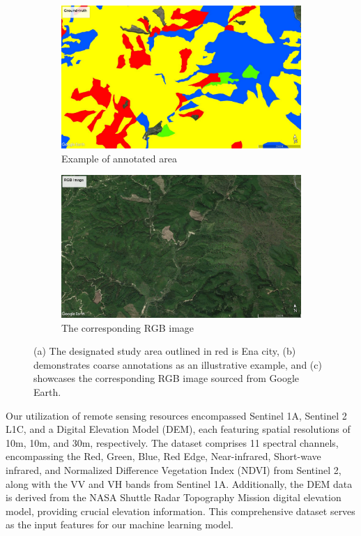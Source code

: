 \begin{figure}[p]
    \begin{subfigure}[c]{.5\textwidth}
      \centering
      \includegraphics[width=\textwidth]{figs/chap5/gt-ge.jpg}
      \caption{Example of annotated area}
      \label{fig:chap5_gtge}
    \end{subfigure}%
    \begin{subfigure}[c]{.5\textwidth}
      \centering
      \includegraphics[width=\textwidth]{figs/chap5/gt-rgb.jpg}
      \caption{The corresponding RGB image}
      \label{fig:chap5_gtrgb}
    \end{subfigure}
    \caption[Study area and annotated data]{(a) The designated study area outlined in red is Ena city, (b) demonstrates coarse annotations as an illustrative example, and (c) showcases the corresponding RGB image sourced from Google Earth.}
    \label{fig:chap5_gifu_gt}
\end{figure}

Our utilization of remote sensing resources encompassed Sentinel 1A, Sentinel 2 L1C, and a Digital Elevation Model (DEM), each featuring  spatial resolutions of 10m, 10m, and 30m, respectively. The dataset comprises 11 spectral channels, encompassing the Red, Green, Blue, Red Edge, Near-infrared, Short-wave infrared, and Normalized Difference Vegetation Index (NDVI) from Sentinel 2, along with the VV and VH bands from Sentinel 1A. Additionally, the DEM data is derived from the NASA Shuttle Radar Topography Mission digital elevation model, providing crucial elevation information. This comprehensive dataset serves as the input features for our machine learning model.\par


